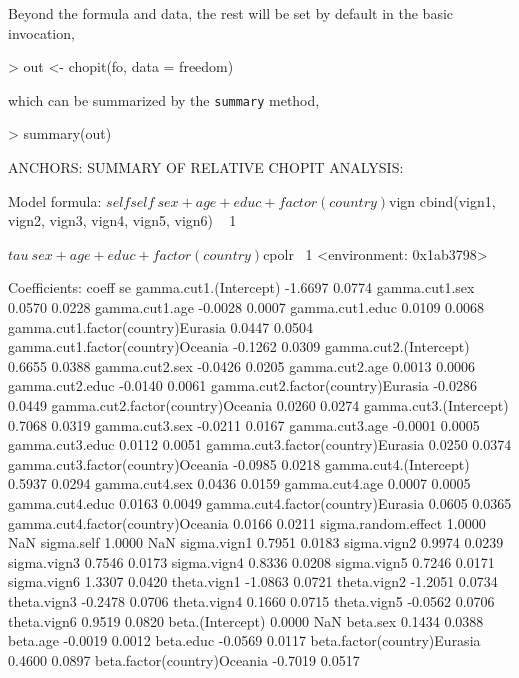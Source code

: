 \documentclass{amsart}
\newcommand{\code}[1]{{\texttt{#1}}}
\begin{document}
Beyond the formula and data, the rest will be set by default in the
basic invocation,
\begin{Schunk}
\begin{Sinput}
> out <- chopit(fo, data = freedom)
\end{Sinput}
\end{Schunk}
which can be summarized by the \code{summary} method,
\begin{Schunk}
\begin{Sinput}
> summary(out)
\end{Sinput}
\begin{Soutput}
ANCHORS: SUMMARY OF RELATIVE CHOPIT ANALYSIS:

Model formula:
$self
self ~ sex + age + educ + factor(country)

$vign
cbind(vign1, vign2, vign3, vign4, vign5, vign6) ~ 1

$tau
~sex + age + educ + factor(country)

$cpolr
~1
<environment: 0x1ab3798>


Coefficients:
                                    coeff     se
gamma.cut1.(Intercept)            -1.6697 0.0774
gamma.cut1.sex                     0.0570 0.0228
gamma.cut1.age                    -0.0028 0.0007
gamma.cut1.educ                    0.0109 0.0068
gamma.cut1.factor(country)Eurasia  0.0447 0.0504
gamma.cut1.factor(country)Oceania -0.1262 0.0309
gamma.cut2.(Intercept)             0.6655 0.0388
gamma.cut2.sex                    -0.0426 0.0205
gamma.cut2.age                     0.0013 0.0006
gamma.cut2.educ                   -0.0140 0.0061
gamma.cut2.factor(country)Eurasia -0.0286 0.0449
gamma.cut2.factor(country)Oceania  0.0260 0.0274
gamma.cut3.(Intercept)             0.7068 0.0319
gamma.cut3.sex                    -0.0211 0.0167
gamma.cut3.age                    -0.0001 0.0005
gamma.cut3.educ                    0.0112 0.0051
gamma.cut3.factor(country)Eurasia  0.0250 0.0374
gamma.cut3.factor(country)Oceania -0.0985 0.0218
gamma.cut4.(Intercept)             0.5937 0.0294
gamma.cut4.sex                     0.0436 0.0159
gamma.cut4.age                     0.0007 0.0005
gamma.cut4.educ                    0.0163 0.0049
gamma.cut4.factor(country)Eurasia  0.0605 0.0365
gamma.cut4.factor(country)Oceania  0.0166 0.0211
sigma.random.effect                1.0000    NaN
sigma.self                         1.0000    NaN
sigma.vign1                        0.7951 0.0183
sigma.vign2                        0.9974 0.0239
sigma.vign3                        0.7546 0.0173
sigma.vign4                        0.8336 0.0208
sigma.vign5                        0.7246 0.0171
sigma.vign6                        1.3307 0.0420
theta.vign1                       -1.0863 0.0721
theta.vign2                       -1.2051 0.0734
theta.vign3                       -0.2478 0.0706
theta.vign4                        0.1660 0.0715
theta.vign5                       -0.0562 0.0706
theta.vign6                        0.9519 0.0820
beta.(Intercept)                   0.0000    NaN
beta.sex                           0.1434 0.0388
beta.age                          -0.0019 0.0012
beta.educ                         -0.0569 0.0117
beta.factor(country)Eurasia        0.4600 0.0897
beta.factor(country)Oceania       -0.7019 0.0517


\end{Soutput}
\end{Schunk}
\end{document}
